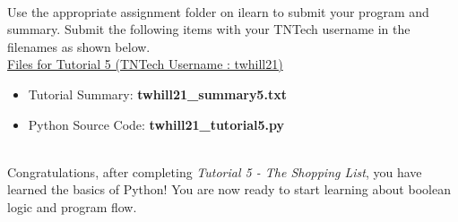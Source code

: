 \documentclass[12pt]{article}
\begin{document}
\begin{description}[labelindent=1cm]
\item[\textbf{\underline{Submission:}}] \hfill \vspace{3mm}\\ 
Use the appropriate assignment folder on ilearn to submit your program and summary. Submit the following items with your TNTech username in the filenames as shown below. \vspace{0mm}\\

\underline{Files for Tutorial 5 (TNTech Username : twhill21)}

\begin{itemize}

\item Tutorial Summary: \textbf{ twhill21\_summary5.txt}

\item Python Source Code: \textbf{ twhill21\_tutorial5.py}

\end{itemize}


\item[\textbf{\underline{Tutorial Complete:}}] \hfill \vspace{3mm}\\ 
	Congratulations, after completing {\it Tutorial 5 - The Shopping List}, you have learned the basics of Python! You are now ready to start learning about boolean logic and program flow. \\

\end{description}
\end{document}
